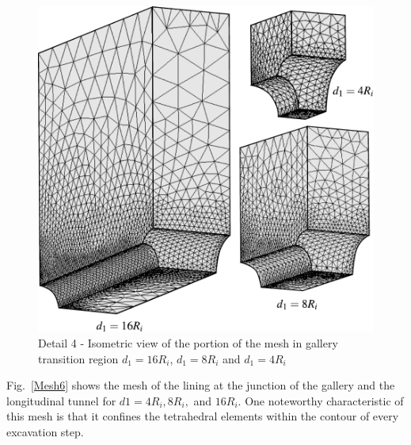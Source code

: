 \documentclass[a4paper,fleqn]{cas-sc}
\begin{document}
\begin{figure}[h!]
	\centering
	\includegraphics[scale=0.6]{Mesh5.pdf}
	\caption{Detail 4 - Isometric view of the portion of the mesh in gallery transition region $d_1=16R_i$, $d_1=8R_i$ and $d_1=4R_i$}
	\label{Mesh5}
\end{figure}
\FloatBarrier
Fig.~\ref{Mesh6} shows the mesh of the lining at the junction of the gallery and the longitudinal tunnel for $d1 = 4R_i, 8R_i,$ and $16R_i$. One noteworthy characteristic of this mesh is that it confines the tetrahedral elements within the contour of every excavation step.
\end{document}

